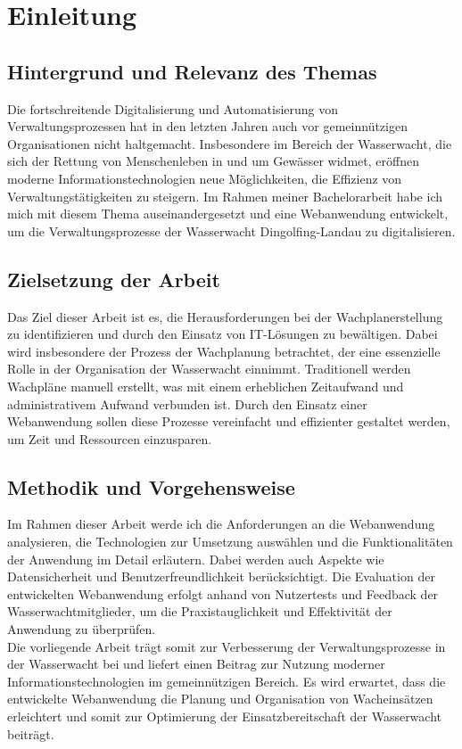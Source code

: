 \documentclass[fontsize=12pt,openright,oneside,paper=a4,BCOR=1cm]{scrbook}
\begin{document}



\tableofcontents

%
%

\chapter{Einleitung}
\section{Hintergrund und Relevanz des Themas}
Die fortschreitende Digitalisierung und Automatisierung von Verwaltungsprozessen hat in den letzten Jahren auch vor gemeinnützigen Organisationen nicht haltgemacht. Insbesondere im Bereich der Wasserwacht, die sich der Rettung von Menschenleben in und um Gewässer widmet, eröffnen moderne Informationstechnologien neue Möglichkeiten, die Effizienz von Verwaltungstätigkeiten zu steigern. Im Rahmen meiner Bachelorarbeit habe ich mich mit diesem Thema auseinandergesetzt und eine Webanwendung entwickelt, um die Verwaltungsprozesse der Wasserwacht Dingolfing-Landau zu digitalisieren. 
\\
\section{Zielsetzung der Arbeit}
Das Ziel dieser Arbeit ist es, die Herausforderungen bei der Wachplanerstellung zu identifizieren und durch den Einsatz von IT-Lösungen zu bewältigen. Dabei wird insbesondere der Prozess der Wachplanung betrachtet, der eine essenzielle Rolle in der Organisation der Wasserwacht einnimmt. Traditionell werden Wachpläne manuell erstellt, was mit einem erheblichen Zeitaufwand und administrativem Aufwand verbunden ist. Durch den Einsatz einer Webanwendung sollen diese Prozesse vereinfacht und effizienter gestaltet werden, um Zeit und Ressourcen einzusparen. 
\\
\section{Methodik und Vorgehensweise}
Im Rahmen dieser Arbeit werde ich die Anforderungen an die Webanwendung analysieren, die Technologien zur Umsetzung auswählen und die Funktionalitäten der Anwendung im Detail erläutern. Dabei werden auch Aspekte wie Datensicherheit und Benutzerfreundlichkeit berücksichtigt. Die Evaluation der entwickelten Webanwendung erfolgt anhand von Nutzertests und Feedback der Wasserwachtmitglieder, um die Praxistauglichkeit und Effektivität der Anwendung zu überprüfen. 
\\
Die vorliegende Arbeit trägt somit zur Verbesserung der Verwaltungsprozesse in der Wasserwacht bei und liefert einen Beitrag zur Nutzung moderner Informationstechnologien im gemeinnützigen Bereich. Es wird erwartet, dass die entwickelte Webanwendung die Planung und Organisation von Wacheinsätzen erleichtert und somit zur Optimierung der Einsatzbereitschaft der Wasserwacht beiträgt. 
\\
\end{document}
